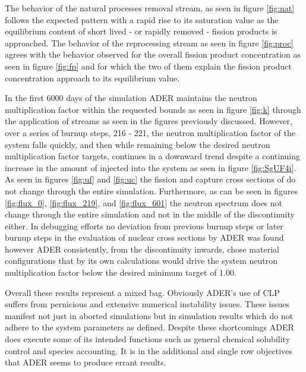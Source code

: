 The behavior of the natural processes removal stream, as seen in figure
\ref{fig:nat} follows the expected pattern with a rapid rise to its
saturation value as the equilibrium content of short lived - or rapidly removed
- fission products is approached. The behavior of the reprocessing stream as 
seen in figure \ref{fig:proc} agrees with the behavior observed for the overall
fission product concentration as seen in figure \ref{fig:fp} and for which the
two of them explain the fission product concentration approach to its
equilibrium value.

In the first 6000 days of the simulation ADER maintains the neutron
multiplication factor within the requested bounds as seen in figure \ref{fig:k}
through the application of streams as seen in the figures previously 
discussed. However, over a series of burnup steps, 216 - 221, the
neutron multiplication factor of the system falls quickly, and then while
remaining below the desired neutron multiplication factor targets, continues
in a downward trend despite a continuing increase in the amount of 
injected into the system as seen in figure \ref{fig:SgUF4i}. As seen in figures
\ref{fig:uf} and \ref{fig:uc} the fission and capture cross sections of 
 do not change through the entire simulation. Furthermore, as
can be seen in figures \ref{fig:flux_0}, \ref{fig:flux_219}, and 
\ref{fig:flux_601} the neutron spectrum does not change through the entire 
simulation and not in the middle of the discontinuity either. In debugging
efforts no deviation from previous burnup steps or later burnup steps
in the evaluation of nuclear cross sections by ADER was found however ADER
consistently, from the discontinuity inwards, chose material configurations
that by its own calculations would drive the system neutron multiplication
factor below the desired minimum target of 1.00.

Overall these results represent a mixed bag. Obviously ADER's use of CLP suffers
from pernicious and extensive numerical instability issues. These issues
manifest not just in aborted simulations but in simulation results which 
do not adhere to the system parameters as defined. Despite these shortcomings
ADER does execute some of its intended functions such as general chemical
solubility control and species accounting. It is in the additional and single
row objectives that ADER seems to produce errant results. 
 

